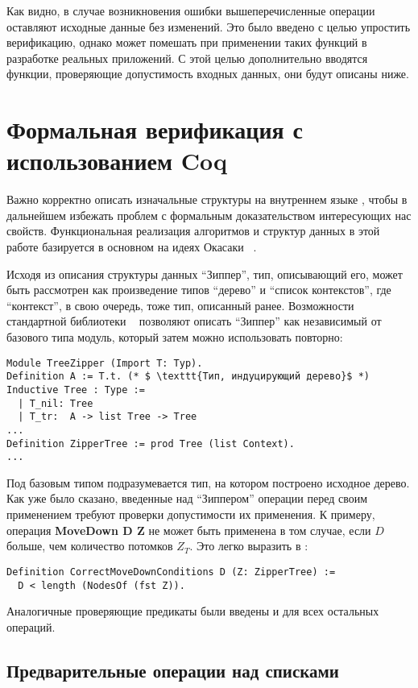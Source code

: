 Как видно, в случае возникновения ошибки вышеперечисленные операции оставляют исходные данные без изменений. Это было введено с целью упростить верификацию, однако может помешать при применении таких функций в разработке реальных приложений. С этой целью дополнительно вводятся функции, проверяющие допустимость входных данных, они будут описаны ниже.

\section{Формальная верификация с использованием Coq}

Важно корректно описать изначальные структуры на внутреннем языке \tcoq, чтобы в дальнейшем избежать проблем с формальным доказательством интересующих нас свойств. Функциональная реализация алгоритмов и структур данных в этой работе базируется в основном на идеях Окасаки ~\autocite{Okasaki1996}.

Исходя из описания структуры данных ``Зиппер'', тип, описывающий его, может быть рассмотрен как произведение типов ``дерево'' и ``список контекстов'', где ``контекст'', в свою очередь, тоже тип, описанный ранее. Возможности стандартной библиотеки \tcoq~ позволяют описать ``Зиппер'' как независимый от базового типа модуль, который затем можно использовать повторно:

\begin{lstlisting}
Module TreeZipper (Import T: Typ).
Definition A := T.t. (* $ \texttt{Тип, индуцирующий дерево}$ *)
Inductive Tree : Type :=
  | T_nil: Tree
  | T_tr:  A -> list Tree -> Tree
...
Definition ZipperTree := prod Tree (list Context).
...
\end{lstlisting}

Под базовым типом подразумевается тип, на котором построено исходное дерево. Как уже было сказано, введенные над ``Зиппером'' операции перед своим применением требуют проверки допустимости их применения. К примеру, операция \textbf{MoveDown D Z} не может быть применена в том случае, если $D$ больше, чем количество потомков $Z_T$. Это легко выразить в \tcoq:
\begin{lstlisting}
Definition CorrectMoveDownConditions D (Z: ZipperTree) :=
  D < length (NodesOf (fst Z)).
\end{lstlisting}
Аналогичные проверяющие предикаты были введены и для всех остальных операций.

\subsection{Предварительные операции над списками}

